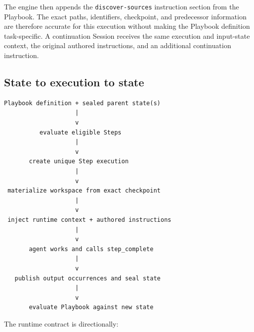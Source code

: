 \documentclass[11pt]{article}
\begin{document}
The engine then appends the \texttt{discover-sources} instruction section from
the Playbook. The exact paths, identifiers, checkpoint, and predecessor
information are therefore accurate for this execution without making the
Playbook definition task-specific. A continuation Session receives the same
execution and input-state context, the original authored instructions, and an
additional continuation instruction.

\subsection{State to execution to state}

\begin{lstlisting}[style=playbook]
Playbook definition + sealed parent state(s)
                    |
                    v
          evaluate eligible Steps
                    |
                    v
       create unique Step execution
                    |
                    v
 materialize workspace from exact checkpoint
                    |
                    v
 inject runtime context + authored instructions
                    |
                    v
       agent works and calls step_complete
                    |
                    v
   publish output occurrences and seal state
                    |
                    v
       evaluate Playbook against new state
\end{lstlisting}

The runtime contract is directionally:
\end{document}
